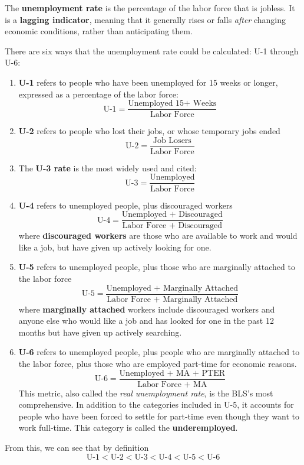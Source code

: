\documentclass{article}
\begin{document}
    \begin{definition}
      The \textbf{unemployment rate} is the percentage of the labor force that is jobless. It is a \textbf{lagging indicator}, meaning that it generally rises or falls \textit{after} changing economic conditions, rather than anticipating them. 

      There are six ways that the unemployment rate could be calculated: U-1 through U-6: 
      \begin{enumerate}
        \item \textbf{U-1} refers to people who have been unemployed for 15 weeks or longer, expressed as a percentage of the labor force: 
        \[\text{U-1} = \frac{\text{Unemployed 15+ Weeks}}{\text{Labor Force}}\]
        \item \textbf{U-2} refers to people who lost their jobs, or whose temporary jobs ended
        \[\text{U-2} = \frac{\text{Job Losers}}{\text{Labor Force}}\]
        \item The \textbf{U-3 rate} is the most widely used and cited: 
        \[\text{U-3} = \frac{\text{Unemployed}}{\text{Labor Force}}\]
        \item \textbf{U-4} refers to unemployed people, plus discouraged workers
        \[\text{U-4} = \frac{\text{Unemployed + Discouraged}}{\text{Labor Force + Discouraged}}\]
        where \textbf{discouraged workers} are those who are available to work and would like a job, but have given up actively looking for one. 
        \item \textbf{U-5} refers to unemployed people, plus those who are marginally attached to the labor force
        \[\text{U-5} = \frac{\text{Unemployed + Marginally Attached}}{\text{Labor Force + Marginally Attached}}\]
        where \textbf{marginally attached} workers include discouraged workers and anyone else who would like a job and has looked for one in the past 12 months but have given up actively searching. 
        \item \textbf{U-6} refers to unemployed people, plus people who are marginally attached to the labor force, plus those who are employed part-time for economic reasons. 
        \[\text{U-6} = \frac{\text{Unemployed + MA + PTER}}{\text{Labor Force + MA}}\]
        This metric, also called the \textit{real unemployment rate}, is the BLS's most comprehensive. In addition to the categories included in U-5, it accounts for people who have been forced to settle for part-time even though they want to work full-time. This category is called the \textbf{underemployed}. 
      \end{enumerate}
      From this, we can see that by definition
      \[\text{U-1} < \text{U-2} < \text{U-3} < \text{U-4} < \text{U-5} < \text{U-6}\]
    \end{definition}
\end{document}
